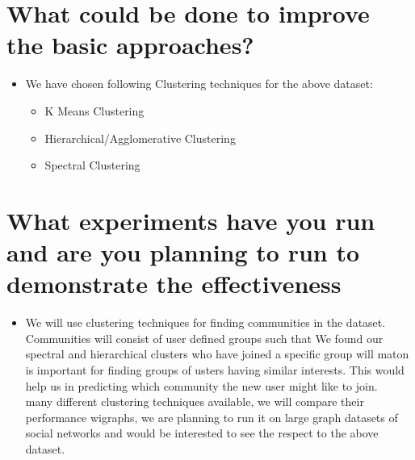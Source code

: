 \documentclass[11pt]{exam}
\begin{document}
\section{What could be done to improve the basic approaches?}

\begin{itemize}

\item[] We have chosen following Clustering techniques for the above dataset:
	
\begin{itemize}
	
\item K Means Clustering
	\item Hierarchical/Agglomerative Clustering 
	\item Spectral Clustering
\end{itemize}

\end{itemize}
\section{ What experiments have you run and are you planning to run to demonstrate the effectiveness}

\begin{itemize}

\item[]  We will use clustering techniques for finding communities in the dataset. Communities will consist of user defined groups such that We found our spectral and hierarchical clusters who have joined a specific group will maton is important for finding groups of usters having similar interests. This would help us in predicting which community the new user might like to join. \\              many different clustering techniques available, we will compare their performance wigraphs, we are planning to run it on large graph datasets of social networks and would be interested to see the respect to the above dataset.
\end{itemize}
\end{document}
